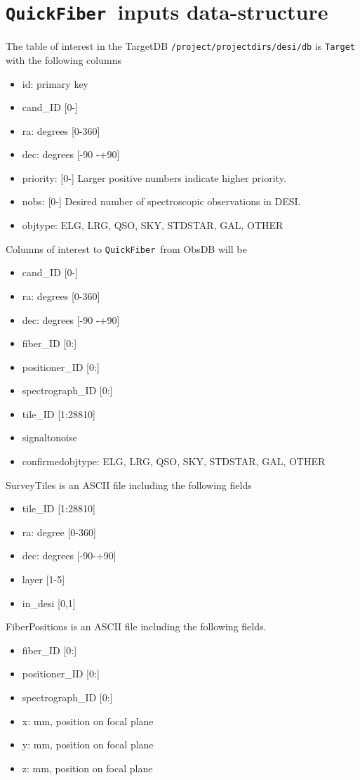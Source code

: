 \documentclass{article}
\newcommand{\code}{{\texttt{QuickFiber}}}
\begin{document}
\section{\code\ inputs data-structure}


The table of interest in the TargetDB \texttt{/project/projectdirs/desi/db}
is \texttt{Target} with the following columns

\begin{itemize}
\item id: primary key
\item cand\_ID [0-]
\item ra: degrees [0-360]
\item dec: degrees [-90 -+90]
\item priority: [0-] Larger positive numbers indicate higher priority.
\item nobs: [0-] Desired number of spectroscopic observations in
  DESI.
\item objtype: ELG, LRG, QSO, SKY, STDSTAR, GAL, OTHER
\end{itemize}

\noindent
Columns of interest to \code\ from ObsDB will be

\begin{itemize}
\item cand\_ID [0-]
\item ra: degrees [0-360]
\item dec: degrees [-90 -+90]
\item fiber\_ID [0:]
\item positioner\_ID  [0:]
\item spectrograph\_ID [0:]
\item tile\_ID [1:28810]
\item signaltonoise
\item confirmedobjtype: ELG, LRG, QSO, SKY, STDSTAR, GAL, OTHER
\end{itemize}

\noindent
SurveyTiles is an ASCII file including the following fields
\begin{itemize}
\item tile\_ID [1:28810]
\item ra: degree [0-360]
\item dec: degrees [-90-+90]
\item layer [1-5]
\item in\_desi [0,1]
\end{itemize}

\noindent
FiberPositions is an ASCII file including the following fields.
\begin{itemize}
\item fiber\_ID [0:]
\item positioner\_ID  [0:]
\item spectrograph\_ID [0:]
\item x: mm, position on focal plane
\item y: mm, position on focal plane
\item z: mm, position on focal plane
\end{itemize}
\end{document}
